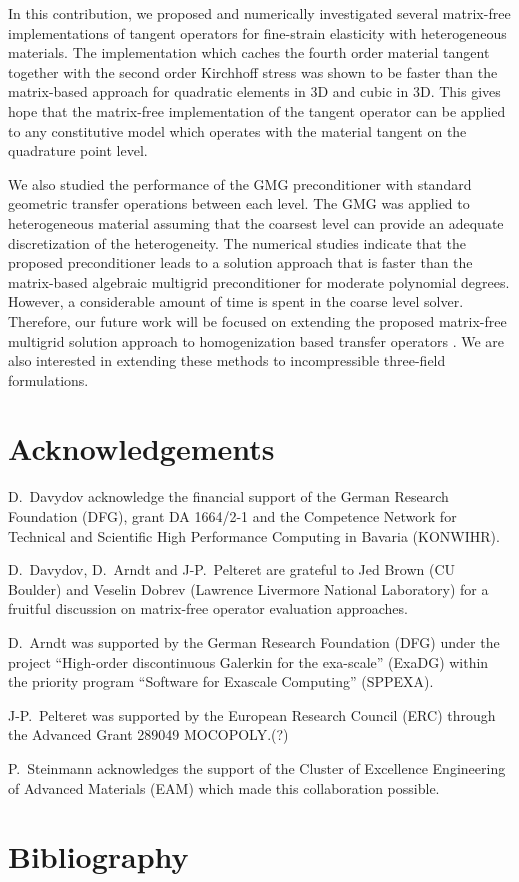 \documentclass[preprint,12pt,times]{elsarticle}
\begin{document}
In this contribution, we proposed and numerically investigated several matrix-free implementations of tangent operators for fine-strain elasticity with heterogeneous materials.
The implementation which caches the fourth order material tangent together with the second order Kirchhoff stress was shown to be faster than the matrix-based approach for quadratic elements in 3D and cubic in 3D.
This gives hope that the matrix-free implementation of the tangent operator can be applied to any constitutive model which operates with the material tangent on the quadrature point level.

We also studied the performance of the GMG preconditioner with standard geometric transfer operations between each level. The GMG was applied to heterogeneous material assuming that the coarsest level can provide an adequate discretization of the heterogeneity. The numerical studies indicate that the proposed preconditioner leads to a solution approach that is faster than the matrix-based algebraic multigrid preconditioner for moderate polynomial degrees. However, a considerable amount of time is spent in the coarse level solver. Therefore, our future work will be focused on extending the proposed matrix-free multigrid solution approach to homogenization based transfer operators \cite{Miehe2007}. We are also interested in extending these methods to incompressible three-field formulations.

\section*{Acknowledgements}

D.~Davydov acknowledge the financial support of the German Research Foundation (DFG), grant DA 1664/2-1
and the Competence Network for Technical and Scientific High Performance Computing in Bavaria (KONWIHR).

D.~Davydov, D.~Arndt and J-P.~Pelteret are grateful to Jed Brown (CU Boulder) and Veselin Dobrev (Lawrence Livermore National Laboratory) for a fruitful discussion on matrix-free operator evaluation approaches.

D.~Arndt was supported by the German Research Foundation (DFG) under the project ``High-order discontinuous
Galerkin for the exa-scale'' (\mbox{ExaDG}) within the priority program ``Software
for Exascale Computing'' (SPPEXA).

{\color{red}
J-P.~Pelteret was supported by the European Research Council (ERC) through
the Advanced Grant 289049 MOCOPOLY.(?)
}

P.~Steinmann acknowledges the support of the Cluster of Excellence Engineering of Advanced Materials (EAM) which made this collaboration possible.

\section*{Bibliography}



\end{document}
